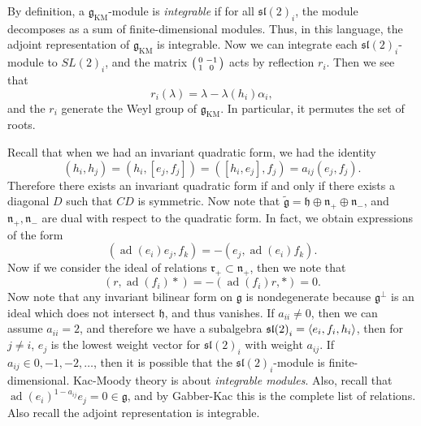 \documentclass[leqno, openany]{memoir}
\theoremstyle{definition}
\theoremstyle{remark}
\theoremstyle{plain}
\theoremstyle{definition}
\theoremstyle{remark}
\newcommand{\mf}[1]{\mathfrak{#1}}
\newcommand{\mr}[1]{\mathrm{#1}}
\newcommand{\wtl}[1]{\widetilde{#1}}
\DeclareMathOperator{\ad}{ad}
\begin{document}
By definition, a $\mf{g}_{\mr{KM}}$-module is \textit{integrable} if for all ${\mf{sl}(2)}_i$, the module decomposes as a sum of finite-dimensional modules. Thus, in this language, the adjoint representation of $\mf{g}_{\mr{KM}}$ is integrable. Now we can integrate each ${\mf{sl}(2)}_i$-module to ${SL(2)}_i$, and the matrix $\begin{psmallmatrix} 0 & -1 \\ 1 & 0 \end{psmallmatrix}$ acts by reflection $r_i$. Then we see that 
\[ r_i(\lambda) = \lambda - \lambda(h_i) \alpha_i, \]
and the $r_i$ generate the Weyl group of $\mf{g}_{\mr{KM}}$. In particular, it permutes the set of roots.

Recall that when we had an invariant quadratic form, we had the identity
\[ (h_i, h_j) = (h_i, [e_j, f_j]) = ([h_i, e_j], f_j) = a_{ij} (e_j, f_j). \]
Therefore there exists an invariant quadratic form if and only if there exists a diagonal $D$ such that $CD$ is symmetric. Now note that $\wtl{ \mf{g} } = \mf{h} \oplus \mf{n}_+ \oplus \mf{n}_-$, and $\mf{n}_+, \mf{n}_-$ are dual with respect to the quadratic form. In fact, we obtain expressions of the form
\[ ( \ad(e_i) e_j, f_k ) = - (e_j, \ad(e_i) f_k). \]
Now if we consider the ideal of relations $\mf{r}_+ \subset \mf{n}_+$, then we note that
\[ (r, \ad(f_i) *) = - (\ad(f_i) r, *) = 0. \]
Now note that any invariant bilinear form on $\mf{g}$ is nondegenerate because $\mf{g}^{\perp}$ is an ideal which does not intersect $\mf{h}$, and thus vanishes. If $a_{ii} \neq 0$, then we can assume $a_{ii} = 2$, and therefore we have a subalgebra ${\mf{sl}(2)}_i = \ev{e_i, f_i, h_i}$, then for $j \neq i$, $e_j$ is the lowest weight vector for ${\mf{sl}(2)}_i$ with weight $a_{ij}$. If $a_{ij} \in 0,-1,-2,\ldots$, then it is possible that the ${\mf{sl}(2)}_i$-module is finite-dimensional. Kac-Moody theory is about \textit{integrable modules}. Also, recall that ${\ad(e_i)}^{1-a_{ij}} e_j = 0 \in \mf{g}$, and by Gabber-Kac this is the complete list of relations. Also recall the adjoint representation is integrable.
\end{document}
